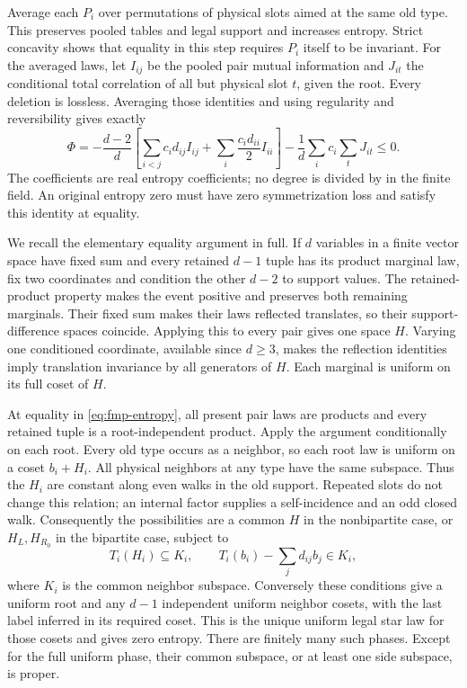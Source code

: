 Average each $P_i$ over permutations of physical slots aimed at the
same old type. This preserves pooled tables and legal support and
increases entropy. Strict concavity shows that equality in this
step requires $P_i$ itself to be invariant. For the averaged laws,
let $I_{ij}$ be the pooled pair mutual information and $J_{it}$ the
conditional total correlation of all but physical slot $t$, given
the root. Every deletion is lossless. Averaging those identities and
using regularity and reversibility gives exactly
\begin{equation}\label{eq:fmp-entropy}
 \Phi=-\frac{d-2}{d}
 \left[\sum_{i<j}c_id_{ij}I_{ij}+\sum_i\frac{c_id_{ii}}2I_{ii}\right]
                    -\frac1d\sum_i c_i\sum_tJ_{it}\le0.
\end{equation}
The coefficients are real entropy coefficients; no degree is divided
by in the finite field. An original entropy zero must have zero
symmetrization loss and satisfy this identity at equality.

We recall the elementary equality argument in full. If $d$ variables
in a finite vector space have fixed sum and every retained $d-1$
tuple has its product marginal law, fix two coordinates and condition
the other $d-2$ to support values. The retained-product property
makes the event positive and preserves both remaining marginals.
Their fixed sum makes their laws reflected translates, so their
support-difference spaces coincide. Applying this to every pair gives
one space $H$. Varying one conditioned coordinate, available since
$d\ge3$, makes the reflection identities imply translation
invariance by all generators of $H$. Each marginal is uniform on
its full coset of $H$.

At equality in \eqref{eq:fmp-entropy}, all present pair laws are
products and every retained tuple is a root-independent product.
Apply the argument conditionally on each root. Every old type occurs
as a neighbor, so each root law is uniform on a coset $b_i+H_i$.
All physical neighbors at any type have the same subspace. Thus the
$H_i$ are constant along even walks in the old support. Repeated
slots do not change this relation; an internal factor supplies a
self-incidence and an odd closed walk. Consequently the possibilities
are a common $H$ in the nonbipartite case, or $H_L,H_{R_0}$ in the
bipartite case, subject to
\begin{equation}\label{eq:fmp-phase}
 T_i(H_i)\subseteq K_i,\qquad
 T_i(b_i)-\sum_jd_{ij}b_j\in K_i,
\end{equation}
where $K_i$ is the common neighbor subspace. Conversely these conditions
give a uniform root and any $d-1$ independent uniform neighbor cosets,
with the last label inferred in its required coset. This is the
unique uniform legal star law for those cosets and gives zero entropy.
There are finitely many such phases. Except for the full uniform
phase, their common subspace, or at least one side subspace, is proper.

